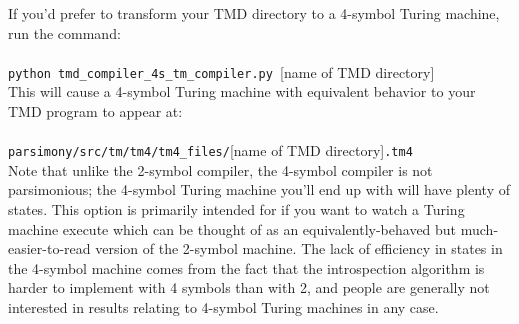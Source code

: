 \documentclass[11pt]{article}
\begin{document}
If you'd prefer to transform your TMD directory to a 4-symbol Turing machine, run the command: \\ \\
\texttt{python tmd_compiler_4s_tm_compiler.py }[name of TMD directory] \\

This will cause a 4-symbol Turing machine with equivalent behavior to your TMD program to appear at: \\ \\
\texttt{parsimony/src/tm/tm4/tm4_files/}[name of TMD directory]\texttt{.tm4} \\

Note that unlike the 2-symbol compiler, the 4-symbol compiler is not parsimonious; the 4-symbol Turing machine you'll end up with will have plenty of states. This option is primarily intended for if you want to watch a Turing machine execute which can be thought of as an equivalently-behaved but much-easier-to-read version of the 2-symbol machine. The lack of efficiency in states in the 4-symbol machine comes from the fact that the introspection algorithm is harder to implement with 4 symbols than with 2, and people are generally not interested in results relating to 4-symbol Turing machines in any case.
\end{document}
